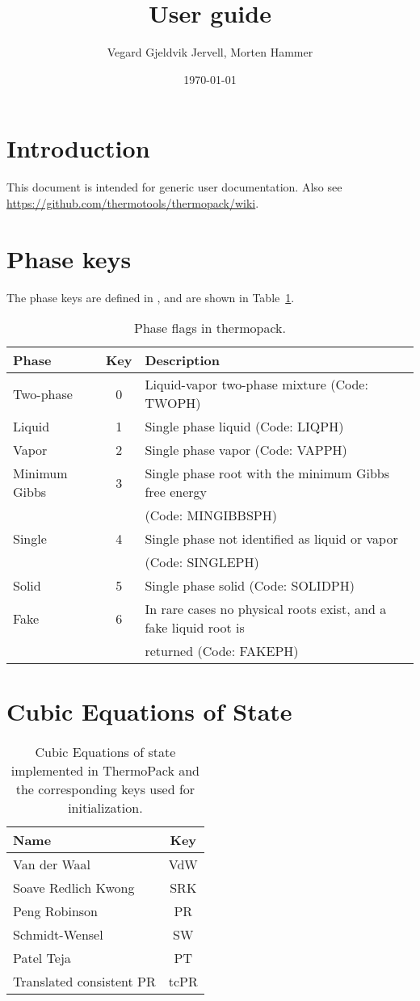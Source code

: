 \documentclass[english]{../thermomemo/thermomemo}
\title{User guide}
\author{Vegard Gjeldvik Jervell, Morten Hammer}
\date{\today}
\begin{document}
\frontmatter
\tableofcontents

\section{Introduction}
This document is intended for generic user documentation. Also see
\url{https://github.com/thermotools/thermopack/wiki}.

\section{Phase keys}
The phase keys are defined in ,
and are shown in Table~\ref{tab:phase_flags_thermopack}.
\begin{table}[ht!]
  \centering
  \begin{tabular}{l c l}
    \toprule
    Phase & Key & Description\\
    \midrule
    Two-phase & 0 & Liquid-vapor two-phase mixture (Code: TWOPH)\\
    Liquid & 1 & Single phase liquid (Code: LIQPH) \\
    Vapor & 2 & Single phase vapor (Code: VAPPH) \\
    Minimum Gibbs & 3 & Single phase root with the minimum Gibbs free energy \\ & & (Code: MINGIBBSPH) \\
    Single & 4 & Single phase not identified as liquid or vapor \\ & & (Code: SINGLEPH) \\
    Solid & 5 & Single phase solid (Code: SOLIDPH) \\
    Fake & 6 & In rare cases no physical roots exist, and a fake liquid root is \\ & & returned (Code: FAKEPH) \\
    \bottomrule
  \end{tabular}
  \caption{Phase flags in thermopack.}
  \label{tab:phase_flags_thermopack}
\end{table}

\section{Cubic Equations of State}

\begin{table}[ht!]
  \centering
  \begin{tabular}{l c }
    \toprule
    Name & Key \\
    \midrule
    Van der Waal & VdW\\
    Soave Redlich Kwong & SRK\\
    Peng Robinson & PR\\
    Schmidt-Wensel & SW\\
    Patel Teja & PT\\
    Translated consistent PR & tcPR\\
    \bottomrule
  \end{tabular}
  \caption{Cubic Equations of state implemented in ThermoPack and the corresponding keys used for initialization.}
  \label{tab:EoS_thermopack}
\end{table}
\end{document}

